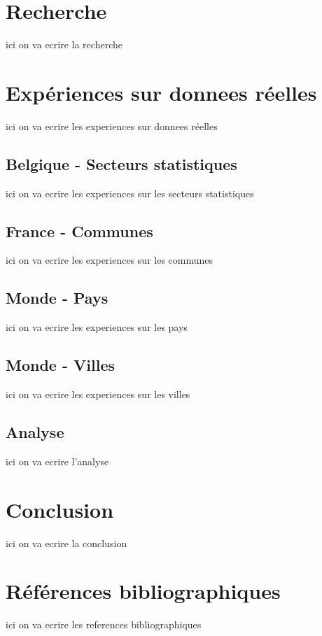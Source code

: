 \documentclass {article}
\begin{document}
\section {Recherche}
ici on va ecrire la recherche

\section {Expériences sur donnees réelles}
ici on va ecrire les experiences sur donnees réelles

\subsection {Belgique - Secteurs statistiques}
ici on va ecrire les experiences sur les secteurs statistiques

\subsection {France - Communes}
ici on va ecrire les experiences sur les communes

\subsection {Monde - Pays}
ici on va ecrire les experiences sur les pays

\subsection {Monde - Villes}
ici on va ecrire les experiences sur les villes

\subsection {Analyse}
ici on va ecrire l'analyse

\section {Conclusion}
ici on va ecrire la conclusion

\section {Références bibliographiques}
ici on va ecrire les references bibliographiques
\end{document}
